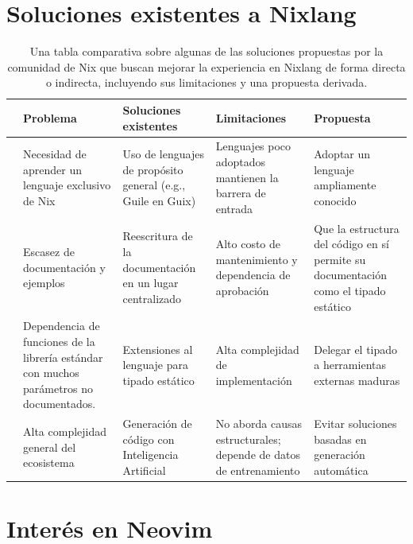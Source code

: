 \sloppy

\section{Soluciones existentes a Nixlang}\label{Appendix1}

\begin{table}[htbp]
\centering
\setlength{\tabcolsep}{4pt}
\begin{tabularx}{\textwidth}{|p{25pt}|X|X|X|X|}
\hline
 & \textbf{Problema} & \textbf{Soluciones} \newline \textbf{existentes} & \textbf{Limitaciones} & \textbf{Propuesta} \\
\hline
\cite{Courts2013} & Necesidad de aprender un lenguaje exclusivo de Nix & Uso de lenguajes de propósito general (e.g., Guile en Guix) & Lenguajes poco adoptados mantienen la barrera de entrada~\cite{stackoverflowMostPopularTechnologies} & Adoptar un lenguaje ampliamente conocido \\
\hline
\cite{gagarinFourMonthsNix} & Escasez de documentación y ejemplos & Reescritura de la documentación en un lugar centralizado & Alto costo de mantenimiento y dependencia de aprobación & Que la estructura del código en sí permite su documentación como el tipado estático \\
\hline
\cite{caddetNixNickel} \newline \cite{hufschmittCurrentStatePtyx} & Dependencia de funciones de la librería estándar con muchos parámetros no documentados. & Extensiones al lenguaje para tipado estático & Alta complejidad de implementación & Delegar el tipado a herramientas externas maduras \\
\hline
\cite{Schwaighofer2026} & Alta complejidad general del ecosistema & Generación de código con Inteligencia Artificial & No aborda causas estructurales; depende de datos de entrenamiento & Evitar soluciones basadas en generación automática \\
\hline
\end{tabularx}
\caption{Una tabla comparativa sobre algunas de las soluciones propuestas por la comunidad de Nix que buscan mejorar la experiencia en Nixlang de forma directa o indirecta, incluyendo sus limitaciones y una propuesta derivada.}
\end{table}

\section{Interés en Neovim}\label{Appendix2}

